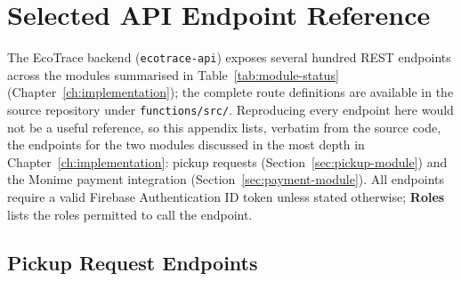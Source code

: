 \chapter{Selected API Endpoint Reference}
\label{app:api}

The EcoTrace backend (\texttt{ecotrace-api}) exposes several hundred REST
endpoints across the modules summarised in
Table~\ref{tab:module-status} (Chapter~\ref{ch:implementation}); the
complete route definitions are available in the source repository under
\texttt{functions/src/}. Reproducing every endpoint here would not be a
useful reference, so this appendix lists, verbatim from the source code,
the endpoints for the two modules discussed in the most depth in
Chapter~\ref{ch:implementation}: pickup requests
(Section~\ref{sec:pickup-module}) and the Monime payment integration
(Section~\ref{sec:payment-module}). All endpoints require a valid Firebase
Authentication ID token unless stated otherwise; \textbf{Roles} lists the
roles permitted to call the endpoint.

\section{Pickup Request Endpoints}

